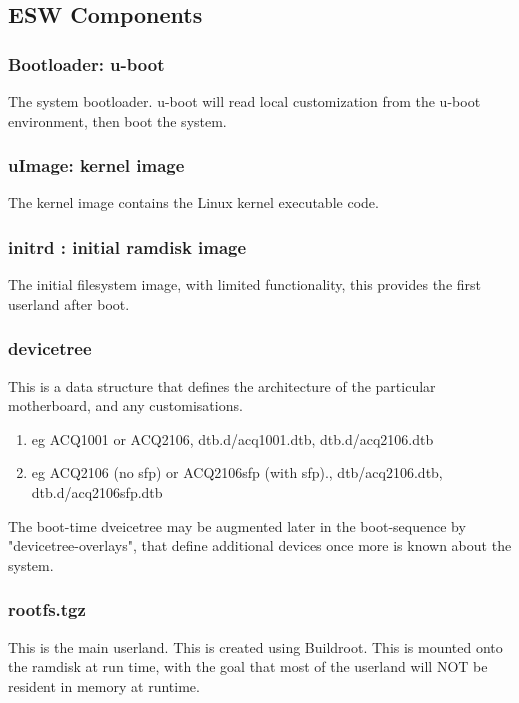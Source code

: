 \documentclass[]{article}
\begin{document}
\subsection{ESW Components}

\subsubsection{Bootloader: u-boot}
The system bootloader. u-boot will read local customization from the u-boot environment, then boot the system.

\subsubsection{uImage: kernel image}
The kernel image contains the Linux kernel executable code.

\subsubsection{initrd : initial ramdisk image}
The initial filesystem image, with limited functionality, this provides the first userland after boot.

\subsubsection{devicetree}
This is a data structure that defines the architecture of the particular motherboard, and any customisations.
\begin{enumerate}
    \item eg ACQ1001 or ACQ2106, dtb.d/acq1001.dtb, dtb.d/acq2106.dtb
    \item eg ACQ2106 (no sfp) or ACQ2106sfp (with sfp)., dtb/acq2106.dtb, dtb.d/acq2106sfp.dtb
\end{enumerate}
The boot-time dveicetree may be augmented later in the boot-sequence by "devicetree-overlays", that define additional devices once more is known about the system.

\subsubsection{rootfs.tgz}
This is the main userland. This is created using Buildroot. This is mounted onto the ramdisk at run time, with the goal that most of the userland will NOT be resident in memory at runtime.
\end{document}
